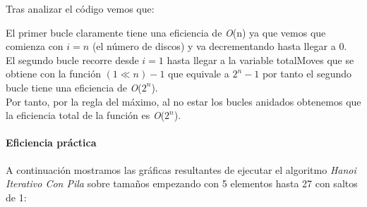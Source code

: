 \documentclass[a4paper,12pt]{article} %
\begin{document}
Tras analizar el código vemos que:

El primer bucle claramente tiene una eficiencia de \textit{O}(n) ya que vemos que comienza con $i=n$ (el número de discos)
y va decrementando hasta llegar a 0.\\

El segundo bucle recorre desde $i=1$ hasta llegar a la variable totalMoves que se obtiene con la función
$(1 \ll n) - 1$ que equivale a $2^n - 1$ por tanto el segundo bucle tiene una eficiencia de \textit{O}($2^n$).\\

Por tanto, por la regla del máximo, al no estar los bucles anidados obtenemos que la eficiencia total de la función es \textit{O}($2^n$).\\

\paragraph{Eficiencia práctica}

A continuación mostramos las gráficas resultantes de ejecutar el algoritmo \textit{Hanoi Iterativo Con Pila}
sobre tamaños empezando con 5 elementos hasta 27 con saltos de 1:
\end{document}
